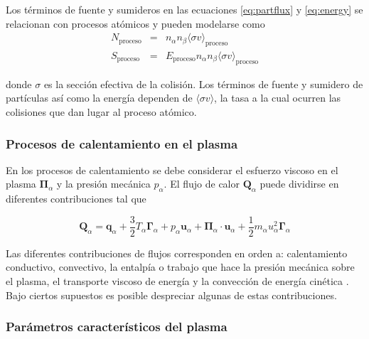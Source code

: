 Los términos de fuente y sumideros en las ecuaciones \eqref{eq:partflux} y \eqref{eq:energy} se relacionan con procesos atómicos y pueden modelarse como \cite{goldston1995}
\begin{eqnarray}
	N_\text{proceso} &=& n_\alpha n_\beta \langle \sigma v \rangle_\text{proceso}\label{eq:particlesSS}\\
	S_\text{proceso} &=& E_\text{proceso} n_\alpha n_\beta \langle \sigma v \rangle_\text{proceso} \label{eq:energySS}
\end{eqnarray}

donde $\sigma$ es la sección efectiva de la colisión. Los términos de fuente y sumidero de partículas así como la energía dependen de $\langle \sigma v\rangle$, la tasa a la cual ocurren las colisiones que dan lugar al proceso atómico.  

\subsubsection{Procesos de calentamiento en el plasma}

En los procesos de calentamiento se debe considerar el esfuerzo viscoso en el plasma $\bm{\Pi}_\alpha$ y la presión mecánica $p_\alpha$. El flujo de calor $\bm{Q}_\alpha$ puede dividirse en diferentes contribuciones tal que

\begin{equation}\label{eq:heatflux}
    \textbf{Q}_\alpha = \textbf{q}_\alpha + \frac{3}{2}T_\alpha\pmb{\Gamma}_\alpha + p_\alpha\textbf{u}_\alpha + \pmb{\Pi}_\alpha\cdot\textbf{u}_\alpha + \frac{1}{2}m_\alpha u_\alpha^2\pmb{\Gamma}_\alpha
  \end{equation}
 
 Las diferentes contribuciones de flujos corresponden en orden a: calentamiento conductivo, convectivo, la entalpía o trabajo que hace la presión mecánica sobre el plasma, el transporte viscoso de energía y la convección de energía cinética \cite{helander2005}. Bajo ciertos supuestos es posible despreciar algunas de estas contribuciones. 
 
 \subsubsection{Parámetros característicos del plasma}
 
